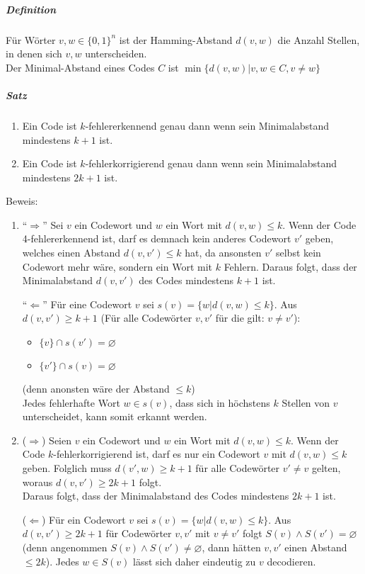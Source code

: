 \documentclass[a4paper]{scrartcl}
\begin{document}
\subparagraph{Definition}
Für Wörter $v,w \in \{ 0,1\}^n$ ist der Hamming-Abstand $d(v,w)$ die Anzahl Stellen, in denen sich $v,w$ unterscheiden.\\
Der Minimal-Abstand eines Codes $C$ ist $\min{\{d(v,w)|v,w\in C, v \neq w \}}$

\subparagraph{Satz}
\begin{enumerate}
\item Ein Code ist $k$-fehlererkennend genau dann wenn sein Minimalabstand mindestens $k+1$ ist.
\item Ein Code ist $k$-fehlerkorrigierend genau dann wenn sein Minimalabstand mindestens $2 k +1$ ist.
\end{enumerate}

Beweis:
\begin{enumerate}
\item "`$\Rightarrow$"' Sei $v$ ein Codewort und $w$ ein Wort mit $d(v,w) \leq k $. Wenn der Code 4-fehlererkennend ist, darf es demnach kein anderes Codewort $v'$ geben, welches einen Abstand $d(v,v') \leq k$ hat, da ansonsten $v'$ selbst kein Codewort mehr wäre, sondern ein Wort mit $k$ Fehlern. Daraus folgt, dass der Minimalabstand $d(v,v')$ des Codes mindestens $k+1$ ist.

"`$\Leftarrow$"' Für eine Codewort $v$ sei $s(v) = \{w | d(v,w) \leq k\}$. Aus $d(v,v') \geq k+1$ (Für alle Codewörter $v,v'$ für die gilt: $v \neq v'$):
\begin{itemize}
\item $\{v\} \cap s (v') = \varnothing$
\item $\{v'\} \cap s(v) = \varnothing$
\end{itemize}
(denn anonsten wäre der Abstand $\leq k$)\\
Jedes fehlerhafte Wort $w \in s(v)$, dass sich in höchstens $k$ Stellen von $v$ unterscheidet, kann somit erkannt werden.
\item ($\Rightarrow$) Seien $v$ ein Codewort und $w$ ein Wort mit $d(v,w) \leq k$. Wenn der Code $k$-fehlerkorrigierend ist, darf es nur ein Codewort $v$ mit $d(v,w) \leq k$ geben. Folglich muss $d(v',w) \geq k +1$ für alle Codewörter $v' \neq v$ gelten, woraus $d(v,v') \geq 2k +1$ folgt.\\
Daraus folgt, dass der Minimalabstand des Codes mindestens $2k+1$ ist.

($\Leftarrow$) Für ein Codewort $v$ sei $s(v) = \{ w | d(v,w) \leq k \}$. Aus $d(v,v') \geq 2k +1$ für Codewörter $v,v'$ mit $v \neq v'$ folgt $S(v) \wedge S(v') = \varnothing$ (denn angenommen $S(v) \wedge S(v') \neq \varnothing$, dann hätten $v,v'$ einen Abstand $\leq 2k$). Jedes $w \in S(v)$ lässt sich daher eindeutig zu $v$ decodieren.
\end{enumerate}
\end{document}

